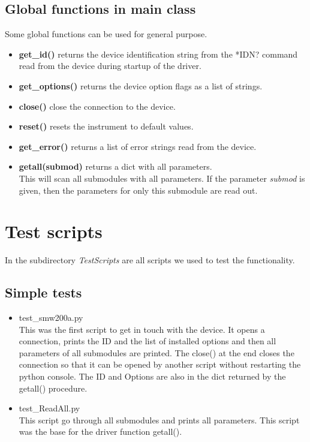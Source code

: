 \documentclass[11pt]{article} %
\begin{document}
\subsection{Global functions in main class}

Some global functions can be used for general purpose.

\begin{itemize}

\item {\bf get\_id()} returns the device identification string from the *IDN? command read from the device during startup of the driver.

\item {\bf get\_options()} returns the device option flags as a list of strings.

\item {\bf close()} close the connection to the device.

\item {\bf reset()} resets the instrument to default values.

\item {\bf get\_error()} returns a list of error strings read from the device.

\item {\bf getall(submod)} returns a dict with all parameters. \\
This will scan all submodules with all parameters. If the parameter {\it submod} is given, then the parameters for only this submodule are read out.

\end{itemize}


\section{Test scripts}

In the subdirectory {\it TestScripts} are all scripts we used to test the functionality.

\subsection{Simple tests}
\begin{itemize}
\item test\_smw200a.py \\
This was the first script to get in touch with the device. It opens a connection, prints the ID and the list of installed options and then all parameters of all submodules are printed. The close() at the end closes the connection so that it can be opened by another script without restarting the python console. The ID and Options are also in the dict returned by the getall() procedure.

\item test\_ReadAll.py \\
This script go through all submodules and prints all parameters. This script was the base for the driver function getall().
\end{itemize}
\end{document}
